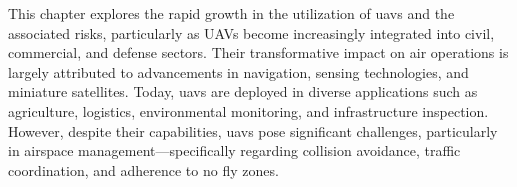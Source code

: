 This chapter explores the rapid growth in the utilization of \glspl{uav} and the associated risks, particularly as UAVs become increasingly integrated into civil, commercial, and defense sectors. Their transformative impact on air operations is largely attributed to advancements in navigation, sensing technologies, and miniature satellites. Today, \glspl{uav} are deployed in diverse applications such as agriculture, logistics, environmental monitoring, and infrastructure inspection. However, despite their capabilities, \glspl{uav} pose significant challenges, particularly in airspace management—specifically regarding collision avoidance, traffic coordination, and adherence to no fly zones.


